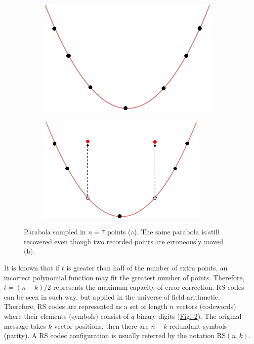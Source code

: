 \documentclass[conference]{IEEEtran}
\begin{document}
\begin{figure}[!hbt]
  \begin{subfigure}[b]{0.45\columnwidth}
    \includegraphics[width=\linewidth]{figures/fig1_a.png}
    \caption{}
    \label{fig:fig1a}
  \end{subfigure}
  \hfill %
  \begin{subfigure}[b]{0.45\columnwidth}
    \includegraphics[width=\linewidth]{figures/fig1_b.png}
    \caption{}
    \label{fig:fig1b}
  \end{subfigure}
  \caption{Parabola sampled in $n=7$ points (a). The same parabola is still recovered even though two recorded points are erroneously moved (b).}
\end{figure}

\par It is known that if $t$ is greater than half of the number of extra points, an incorrect polynomial function may fit the greatest number of points. Therefore, $t = (n - k)/2$ represents the maximum capacity of error correction. RS codes can be seen in such way, but applied in the universe of field arithmetic. Therefore, RS codes are represented as a set of length $n$ vectors (codewords) where their elements (symbols) consist of $q$ binary digits (\hyperref[fig:fig2]{Fig. 2}). The original message takes $k$ vector positions, then there are $n-k$ redundant symbols (parity). A RS codec configuration is usually referred by the notation RS$(n, k)$.    
\end{document}
